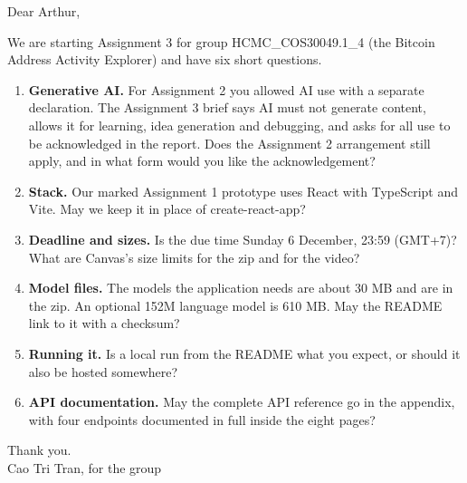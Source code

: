 \begin{summarybox}
Dear Arthur,

We are starting Assignment 3 for group HCMC\_COS30049.1\_4 (the Bitcoin Address Activity Explorer)
and have six short questions.

\begin{enumerate}
  \item \textbf{Generative AI.} For Assignment 2 you allowed AI use with a separate declaration.
    The Assignment 3 brief says AI must not generate content, allows it for learning, idea
    generation and debugging, and asks for all use to be acknowledged in the report. Does the
    Assignment 2 arrangement still apply, and in what form would you like the acknowledgement?
  \item \textbf{Stack.} Our marked Assignment 1 prototype uses React with TypeScript and Vite. May
    we keep it in place of create-react-app?
  \item \textbf{Deadline and sizes.} Is the due time Sunday 6 December, 23:59 (GMT+7)? What are
    Canvas's size limits for the zip and for the video?
  \item \textbf{Model files.} The models the application needs are about 30 MB and are in the zip.
    An optional 152M language model is 610 MB. May the README link to it with a checksum?
  \item \textbf{Running it.} Is a local run from the README what you expect, or should it also be
    hosted somewhere?
  \item \textbf{API documentation.} May the complete API reference go in the appendix, with four
    endpoints documented in full inside the eight pages?
\end{enumerate}

Thank you. \\
Cao Tri Tran, for the group
\end{summarybox}
